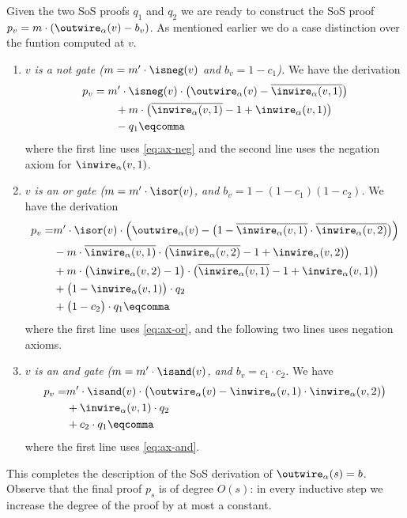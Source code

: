 Given the two SoS proofs $q_1$ and $q_2$ we are ready to construct the
SoS proof $p_v = m \cdot (\outwire_\alpha(v) - b_v)$. As mentioned earlier
we do a case distinction over the funtion computed at $v$.
\begin{enumerate}
\item \emph{$v$ is a \emph{not} gate ($m = m' \cdot \isneg(v)$ and $b_v = 1-c_1$).} We have the derivation
  \begin{align}
    \nonumber
    p_v &=  m' \cdot \isneg(v) \cdot
             \big(\outwire_{\alpha}(v) - \overline{\inwire_{\alpha}(v, 1)}\big) \\\nonumber
           &\qquad + m \cdot
             \big(\overline{\inwire_{\alpha}(v, 1)} - 1 + \inwire_{\alpha}(v, 1)\big)\\
           &\qquad - q_1\eqcomma
  \end{align}
  where the first line uses \cref{eq:ax-neg} and the
  second line uses the negation axiom for $\inwire_{\alpha}(v, 1)$.
\item \emph{$v$ is an \emph{or} gate ($m = m' \cdot \isor(v)$, and $b_v = 1-(1-c_1)(1-c_2)$.} We have the derivation
  \begin{align}
    \nonumber
    p_v =  & m' \cdot \isor(v) \cdot 
             \Big(
             \outwire_{\alpha}(v) -
             \big(
             1 -
             \overline{\inwire_{\alpha}(v, 1)} \cdot
             \overline{\inwire_{\alpha}(v, 2)}
             \big)
             \Big)\\\nonumber
           & -
             m \cdot
             \overline{\inwire_\alpha(v, 1)} \cdot
             \big(
             \overline{\inwire_{\alpha}(v, 2)}
             - 1 + \inwire_{\alpha}(v, 2)
             \big)\\\nonumber
           & +
             m \cdot
             \big(
             \inwire_\alpha(v, 2) - 1
             \big)
             \cdot
             \big(
             \overline{\inwire_{\alpha}(v, 1)}
             - 1 + \inwire_{\alpha}(v, 1)
             \big)\\\nonumber
           & +
             \big(
             1 - \inwire_\alpha(v, 1)
             \big)
             \cdot
             q_2 \\
           & +
             \big(
             1 - c_2
             \big)
             \cdot
             q_1\eqcomma
  \end{align}
  where the first line uses \cref{eq:ax-or}, and the
  following two lines uses negation axioms.
\item \emph{$v$ is an \emph{and} gate ($m = m' \cdot \isand(v)$, and $b_v = c_1 \cdot c_2$.} We have
  \begin{align}
    \nonumber
    p_v =  & m' \cdot \isand(v) \cdot
             \big(
             \outwire_{\alpha}(v) -
             \inwire_{\alpha}(v, 1) \cdot
             \inwire_{\alpha}(v, 2)
             \big)\\\nonumber
           & +
             \inwire_\alpha(v, 1)
             \cdot
             q_2 \\
           & +
             c_2
             \cdot
             q_1\eqcomma
  \end{align}
  where the first line uses \cref{eq:ax-and}.
\end{enumerate}
This completes the description of the SoS derivation of
$\outwire_\alpha(s) = b$.
%
Observe that the final proof $p_s$ is of degree $O(s)$: in every
inductive step we increase the degree of the proof by at most a
constant.
